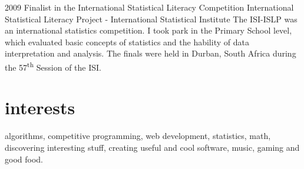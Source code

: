 \documentclass[]{friggeri-cv} %
\begin{document}
\begin{entrylist}


\entry
{2009}
{Finalist in the International Statistical Literacy Competition}
{International Statistical Literacy Project - International Statistical Institute}
{The ISI-ISLP was an international statistics competition. I took park in the Primary School level, which evaluated basic concepts of statistics and the hability of data interpretation and analysis. The finals were held in Durban, South Africa during the 57\textsuperscript{th} Session of the ISI.}


\end{entrylist}


\section{interests}

algorithms, competitive programming, web development, statistics, math, discovering interesting stuff, creating useful and cool software, music, gaming and good food.
\end{document}
